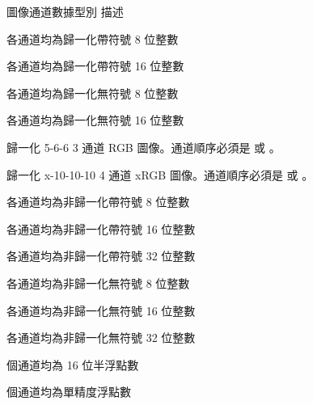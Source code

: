 \bTABLE[option=stretch]

\bTABLEhead
\bTR[background=color,backgroundcolor=gray]
  \bTH 圖像通道數據型別 \eTH
  \bTH 描述 \eTH
\eTR
\eTABLEhead

\bTABLEbody

\bTR
  \bTD {} \eTD
  \bTD 各通道均為歸一化帶符號 8 位整數 \eTD
\eTR

\bTR
  \bTD {} \eTD
  \bTD 各通道均為歸一化帶符號 16 位整數 \eTD
\eTR

\bTR
  \bTD {} \eTD
  \bTD 各通道均為歸一化無符號 8 位整數 \eTD
\eTR

\bTR
  \bTD {} \eTD
  \bTD 各通道均為歸一化無符號 16 位整數 \eTD
\eTR

\bTR
  \bTD {} \eTD
  \bTD 歸一化 5-6-6 3 通道 RGB 圖像。通道順序必須是  或 。 \eTD
\eTR

\bTR
  \bTD {} \eTD
  \bTD 歸一化 x-10-10-10 4 通道 xRGB 圖像。通道順序必須是  或 。 \eTD
\eTR

\bTR
  \bTD {} \eTD
  \bTD 各通道均為非歸一化帶符號 8 位整數 \eTD
\eTR

\bTR
  \bTD {} \eTD
  \bTD 各通道均為非歸一化帶符號 16 位整數 \eTD
\eTR

\bTR
  \bTD {} \eTD
  \bTD 各通道均為非歸一化帶符號 32 位整數 \eTD
\eTR

\bTR
  \bTD {} \eTD
  \bTD 各通道均為非歸一化無符號 8 位整數 \eTD
\eTR

\bTR
  \bTD {} \eTD
  \bTD 各通道均為非歸一化無符號 16 位整數 \eTD
\eTR

\bTR
  \bTD {} \eTD
  \bTD 各通道均為非歸一化無符號 32 位整數 \eTD
\eTR

\bTR
  \bTD {} \eTD
  \bTD 個通道均為 16 位半浮點數 \eTD
\eTR

\bTR
  \bTD {} \eTD
  \bTD 個通道均為單精度浮點數 \eTD
\eTR

\eTABLEbody

\eTABLE


